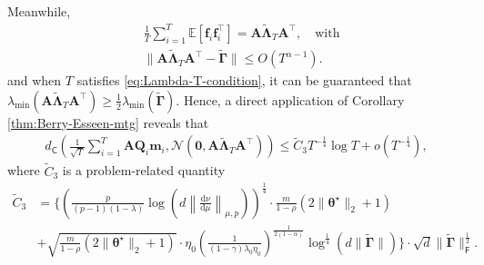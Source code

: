Meanwhile,
\begin{align*}
&\frac{1}{T}\sum_{i=1}^T \mathbb{E}[\bm{f}_i\bm{f}_i^\top] = \bm{A}\tilde{\bm{\Lambda}}_T \bm{A}^\top, \quad \text{with} \\ 
&\|\bm{A}\tilde{\bm{\Lambda}}_T \bm{A}^\top - \tilde{\bm{\Gamma}}\| \leq O(T^{\alpha-1}).
\end{align*} 
and when $T$ satisfies \eqref{eq:Lambda-T-condition}, it can be guaranteed that $\lambda_{\min}(\bm{A}\tilde{\bm{\Lambda}}_T \bm{A}^\top) \geq \frac{1}{2}\lambda_{\min}(\tilde{\bm{\Gamma}})$. Hence, a direct application of Corollary \ref{thm:Berry-Esseen-mtg} reveals that
\begin{align}\label{eq:markov-Berry-Esseen-I31}
d_{\mathsf{C}}\left(\frac{1}{\sqrt{T}}\sum_{i=1}^T \bm{AQ}_i \bm{m}_i,\mathcal{N}(\bm{0},\bm{A}\tilde{\bm{\Lambda}}_T \bm{A}^\top)\right) \leq \widetilde{C}_3 T^{-\frac{1}{4}}\log T + o(T^{-\frac{1}{4}}),
\end{align}
where $\widetilde{C}_3$ is a problem-related quantity
\begin{align}
\widetilde{C}_3 &= \Bigg\{ \left(\frac{p}{(p-1)(1-\lambda)}\log\left(d\left\|\frac{\mathrm{d}\nu}{\mathrm{d}\mu}\right\|_{\mu,p}\right)\right)^{\frac{1}{4}}\cdot \frac{m}{1-\rho}(2\|\bm{\theta}^\star\|_2+1) \nonumber \\ 
&+ \sqrt{\frac{m}{1-\rho}(2\|\bm{\theta}^\star\|_2+1)} \cdot \eta_0 \left(\frac{1}{(1-\gamma)\lambda_0\eta_0}\right)^{\frac{1}{2(1-\alpha)}} \log^{\frac{1}{4}}(d\|\tilde{\bm{\Gamma}}\|) \Bigg\} \cdot \sqrt{d}\|\tilde{\bm{\Gamma}}\|_{\mathsf{F}}^{\frac{1}{2}}.\label{eq:Berry-Esseen-C3}
\end{align}

